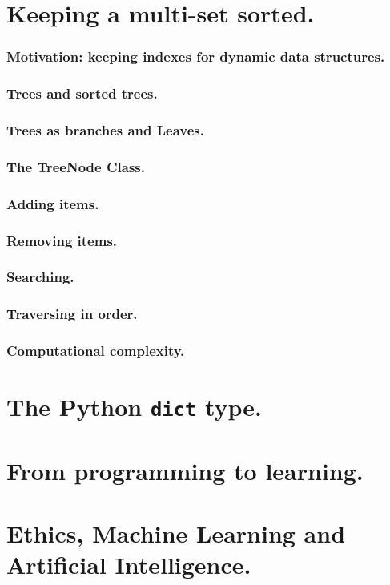 \documentclass{beamer} %
\begin{document}
\section{Keeping a multi-set sorted.}

\begin{frame}
\frametitle{Motivation: keeping indexes for dynamic data structures.}
\end{frame}

\begin{frame}
\frametitle{Trees and sorted trees.}
\end{frame}

\begin{frame}
\frametitle{Trees as branches and Leaves.}
\end{frame}

\begin{frame}
\frametitle{The TreeNode Class.}
\end{frame}

\begin{frame}
\frametitle{Adding items.}
\end{frame}

\begin{frame}
\frametitle{Removing items.}
\end{frame}

\begin{frame}
\frametitle{Searching.}
\end{frame}

\begin{frame}
\frametitle{Traversing in order.}
\end{frame}

\begin{frame}
\frametitle{Computational complexity.}
\end{frame}

\section{The Python \texttt{dict} type.}

\section{From programming to learning.}

\section{Ethics, Machine Learning and Artificial Intelligence.}



\end{document}
